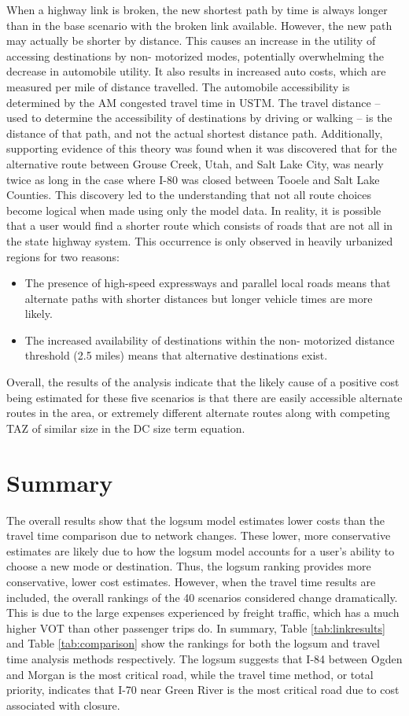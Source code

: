 When a highway link is broken, the new
shortest path by time is always longer than in the base scenario with the broken link
available. However, the new path may actually be shorter by distance. This
causes an increase in the utility of accessing destinations by non-
motorized modes, potentially overwhelming the decrease in automobile
utility. It also results in increased auto costs, which are measured per mile of distance travelled. The automobile accessibility is determined by the AM congested
travel time in USTM. The travel distance
– used to determine the accessibility of destinations by driving or
walking – is the distance of that path, and not the actual shortest
distance path. Additionally,
supporting evidence of this theory was found when it was discovered that for
the alternative route between Grouse Creek, Utah, and Salt Lake City,
was nearly twice as long in the case where I-80 was closed between
Tooele and Salt Lake Counties. This discovery led to the understanding that not all
route choices become logical when made using only the model data. In
reality, it is possible that a user would find a shorter route
which consists of roads that are not all in the state highway system.
This occurrence is only observed in heavily urbanized regions for two reasons:
\begin{itemize}
	\item The presence of high-speed expressways and parallel local roads
  means that alternate paths with shorter distances but longer vehicle
  times are more likely.
	\item The increased availability of destinations within the non-
  motorized distance threshold (2.5 miles) means that alternative
  destinations exist.
\end{itemize}

Overall, the results of the analysis indicate that the likely cause of a
positive cost being estimated for these five scenarios is that there are
easily
accessible alternate routes in the area, or extremely different alternate
routes along with competing TAZ of similar size in the DC size term
equation.

\section{Summary}

The overall results show that the logsum model estimates lower costs than the
travel time comparison due to network changes. These lower, more conservative
estimates are likely due to how the logsum model accounts for a user's
ability to choose a new mode or destination. Thus, the logsum ranking provides more
conservative, lower cost estimates. However, when the travel time results are included, the
overall rankings of the 40 scenarios considered change dramatically. This
is due to the large expenses experienced by freight traffic, which has a
much higher VOT than other passenger trips do. In summary, Table
\ref{tab:linkresults} and Table \ref{tab:comparison} show the rankings
for both the logsum and travel time analysis methods respectively. The
logsum suggests that I-84 between Ogden and Morgan is the most critical
road, while the travel time method, or total priority, indicates that I-70
near Green River is the most critical road due to cost associated with
closure.
